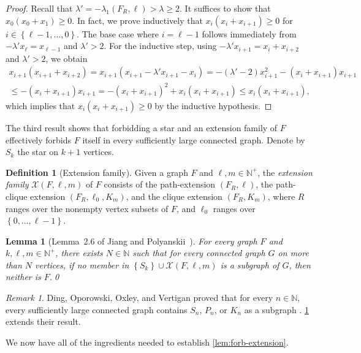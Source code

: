 \documentclass[11pt]{article}
\newtheorem{lemma}[theorem]{Lemma}
\theoremstyle{definition}
\newtheorem{definition}[theorem]{Definition}
\theoremstyle{remark}
\newtheorem*{remark}{Remark}
\newcommand{\sset}[1]{\left\{{#1}\right\}}
\newcommand{\la}{\lambda}
\newcommand{\N}{\mathbb{N}}
\newcommand{\X}{\mathcal{X}}
\begin{document}
\begin{proof}
    Recall that $\la' = -\la_1(F_R, \ell) > \la \ge 2$. It suffices to show that $x_0(x_0 + x_1)\ge 0$. In fact, we prove inductively that $x_i(x_i + x_{i+1}) \ge 0$ for $i \in \sset{\ell-1, \dots, 0}$. The base case where $i = \ell-1$ follows immediately from $-\la' x_\ell = x_{\ell-1}$ and $\la' > 2$. For the inductive step, using $-\la' x_{i+1} = x_i + x_{i+2}$ and $\la' > 2$, we obtain
    \begin{multline*}
        x_{i+1}(x_{i+1} + x_{i+2}) = x_{i+1}(x_{i+1} - \la'x_{i+1}-x_i) = -(\la'-2)x_{i+1}^2 - (x_i + x_{i+1})x_{i+1} \\
        \le -(x_i + x_{i+1})x_{i+1} = -(x_i + x_{i+1})^2 + x_i(x_i + x_{i+1}) \le x_i(x_i + x_{i+1}),
    \end{multline*}
    which implies that $x_i(x_i+x_{i+1}) \ge 0$ by the inductive hypothesis.
\end{proof}

The third result shows that forbidding a star and an extension family of $F$ effectively forbids $F$ itself in every sufficiently large connected graph. Denote by $S_k$ the star on $k+1$ vertices.

\begin{definition}[Extension family]
    Given a graph $F$ and $\ell, m \in \N^+$, the \emph{extension family} $\X(F, \ell, m)$ of $F$ consists of the path-extension $(F_R, \ell)$, the path-clique extension $(F_R, \ell_0, K_m)$, and the clique extension $(F_R, K_m)$, where $R$ ranges over the nonempty vertex subsets of $F$, and $\ell_0$ ranges over $\sset{0, \dots, \ell-1}$.
\end{definition}

\begin{lemma}[Lemma~2.6 of Jiang and Polyanskii~\cite{JP25}] \label{lem:forbid-extensions}
    For every graph $F$ and $k, \ell, m \in \N^+$, there exists $N \in \N$ such that for every connected graph $G$ on more than $N$ vertices, if no member in $\sset{S_k} \cup \X(F, \ell, m)$ is a subgraph of $G$, then neither is $F$.\qed
\end{lemma}

\begin{remark}
    Ding, Oporowski, Oxley, and Vertigan proved that for every $n \in \N$, every sufficiently large connected graph contains $S_n$, $P_n$, or $K_n$ as a subgraph \cite[Theorem 5.3]{DOOV}. \cref{lem:forbid-extensions} extends their result.
\end{remark}

We now have all of the ingredients needed to establish \cref{lem:forb-extension}.
\end{document}
